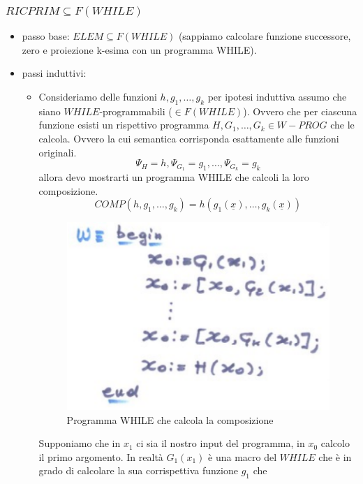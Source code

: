 \documentclass{article}
\begin{document}
\subsubsection{$RICPRIM\subseteq F(WHILE)$}
\begin{itemize}
    \item passo base: $ELEM\subseteq F(WHILE)$ (sappiamo calcolare funzione successore, zero
          e proiezione k-esima con un programma WHILE).
    \item passi induttivi:
          \begin{itemize}
              \item
                    Consideriamo delle funzioni $h,g_1,\dots,g_k$ per ipotesi induttiva assumo
                    che siano $WHILE$-programmabili ($\in F(WHILE)$). Ovvero che per ciascuna funzione
                    esisti un rispettivo programma $H,G_1,\dots,G_k\in W-PROG$ che le calcola. Ovvero
                    la cui semantica corrisponda esattamente alle funzioni originali.
                    $$\Psi_H=h, \Psi_{G_1}=g_1,\dots,\Psi_{G_k}=g_k$$
                    allora devo mostrarti un programma WHILE che calcoli la loro composizione.
                    $$COMP(h,g_1,\dots,g_k)=h(g_1(\underline{x}),\dots,g_k(\underline{x}))$$
                    \begin{figure}[H]
                        \centering
                        \includegraphics[scale=0.5]{images/while-comp.png}
                        \caption{Programma WHILE che calcola la composizione}
                    \end{figure}
                    Supponiamo che in $x_1$ ci sia il nostro input del programma, in $x_0$
                    calcolo il primo argomento. In realtà $G_1(x_1)$ è una macro del $WHILE$
                    che è in grado di calcolare la sua corrispettiva funzione $g_1$ che

\end{itemize}
\end{itemize}
\end{document}
